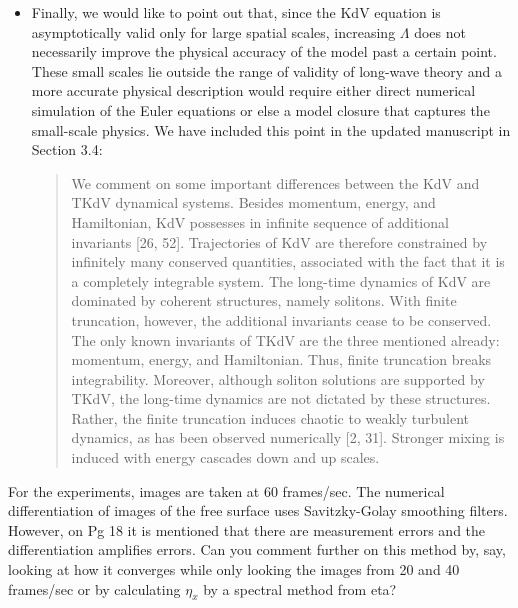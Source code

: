 \documentclass[11pt]{article}
\newcommand{\comment}[1]{{\color{blue} #1}}
\begin{document}
\begin{itemize}
\item Finally, we would like to point out that, since the KdV equation is asymptotically valid only for large spatial scales, increasing $\Lambda$ does not necessarily improve the physical accuracy of the model past a certain point. These small scales lie outside the range of validity of long-wave theory and a more accurate physical description would require either direct numerical simulation of the Euler equations or else a model closure that captures the small-scale physics. We have included this point in the updated manuscript in Section 3.4:
\begin{quotation}
We comment on some important differences between the KdV and TKdV dynamical systems. Besides momentum, energy, and Hamiltonian, KdV possesses in infinite sequence of additional invariants [26, 52]. Trajectories of KdV are therefore constrained by infinitely many conserved quantities, associated with the fact that it is a completely integrable system. The long-time dynamics of KdV are dominated by coherent structures, namely solitons. With finite truncation, however, the additional invariants cease to be conserved. The only known invariants of TKdV are the three mentioned already: momentum, energy, and Hamiltonian. Thus, finite truncation breaks integrability. Moreover, although soliton solutions are supported by TKdV, the long-time dynamics are not dictated by these structures. Rather, the finite truncation induces chaotic to weakly turbulent dynamics, as has been observed numerically [2, 31]. Stronger mixing is induced
with energy cascades down and up scales.
\end{quotation}
\end{itemize}

\noindent
\comment{For the experiments, images are taken at 60 frames/sec. The numerical differentiation of images of the free surface uses Savitzky-Golay smoothing filters. However, on Pg 18 it is mentioned that there are measurement errors and the differentiation amplifies errors. Can you comment further on this method by, say, looking at how it converges while only looking the images from 20 and 40 frames/sec or by calculating $\eta_x$ by a spectral method from eta? }
\end{document}
